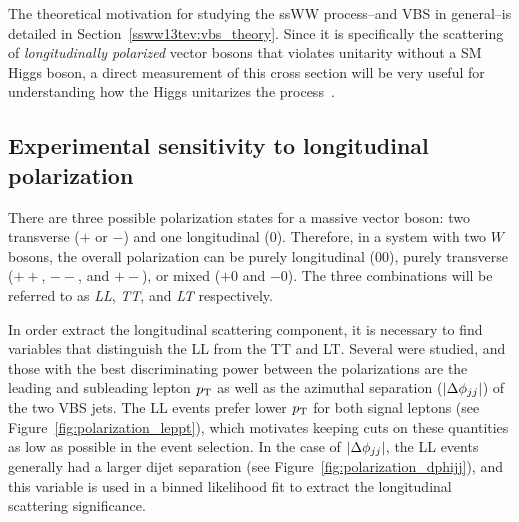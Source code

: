 The theoretical motivation for studying the ssWW process--and VBS in general--is detailed in Section~\ref{ssww13tev:vbs_theory}.
Since it is specifically the scattering of \emph{longitudinally polarized} vector bosons that violates unitarity without a SM Higgs boson, a direct measurement of this cross section will be very useful for understanding how the Higgs unitarizes the process~\cite{2013.longitudinal-theory}.


\subsection{Experimental sensitivity to longitudinal polarization}\label{sec:sswwupgrade_longitudinal_sens}
There are three possible polarization states for a massive vector boson: two transverse ($+$ or $-$) and one longitudinal ($0$).
Therefore, in a system with two $W$ bosons, the overall polarization can be purely longitudinal ($00$), purely transverse ($++$, $--$, and $+-$), or mixed ($+0$ and $-0$).
The three combinations will be referred to as \emph{LL}, \emph{TT}, and \emph{LT} respectively.

In order extract the longitudinal scattering component, it is necessary to find variables that distinguish the LL from the TT and LT.
Several were studied, and those with the best discriminating power between the polarizations are the leading and subleading lepton $p_{\mathrm{T}}$ as well as the azimuthal separation ($|\Delta\phi_{jj}|$) of the two VBS jets.
The LL events prefer lower $p_{\mathrm{T}}$ for both signal leptons (see Figure~\ref{fig:polarization_leppt}), which motivates keeping cuts on these quantities as low as possible in the event selection.%
In the case of $|\Delta\phi_{jj}|$, the LL events generally had a larger dijet separation (see Figure~\ref{fig:polarization_dphijj}), and this variable is used in a binned likelihood fit to extract the longitudinal scattering significance.

